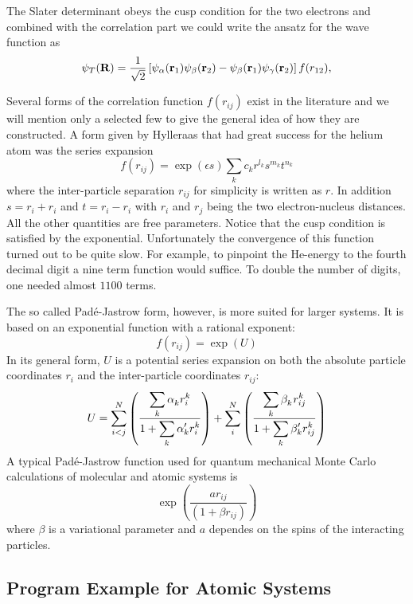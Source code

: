 The Slater determinant obeys the cusp condition for the two electrons and combined with the correlation
part we could write the ansatz for the wave function as
\[
   \psi_T({\bf R})=\frac{1}{\sqrt{2}}\left[
\psi_{\alpha}({\bf r}_1)\psi_{\beta}({\bf r}_2)-
\psi_{\beta}({\bf r}_1)\psi_{\gamma}({\bf r}_2)\right]f(r_{12}),
\]

Several forms of the correlation function $f(r_{ij})$ exist in the literature and we
will mention only a selected few to give the general idea of how they
are constructed. A form given by Hylleraas 
 that had great success for the helium atom was the
series expansion
\[
f(r_{ij})=\exp{(\epsilon s)}\sum_k c_k r^{l_k} s^{m_k} t^{n_k}
\]
where the inter-particle separation $r_{ij}$ for simplicity is written
as $r$. In addition $s=r_i+r_i$ and $t=r_i-r_i$ with $r_i$ and $r_j$ being the two
electron-nucleus distances. All the other quantities are free
parameters. Notice that the cusp condition is satisfied by the
exponential. Unfortunately the convergence of this function turned out
to be quite slow. For example, to pinpoint the He-energy to the fourth
decimal digit a nine term
function would suffice. To double the number of digits, one needed
almost $1100$ terms.

The so called Pad\'e-Jastrow form, however, is more suited for larger
systems. It is based on an exponential function with a rational
exponent:
\[
f(r_{ij})=\exp{(U)}
\]
In its general form, $U$ is a potential series expansion on both the
absolute particle coordinates $r_i$ and the inter-particle coordinates
$r_{ij}$:
\[
U=
\sum_{i<j}^{N}\left(
\frac{\displaystyle\sum_k\alpha_k^{\phantom{k}} r_i^k}
{\displaystyle 1+\sum_k\alpha_k^{\prime\vphantom{k}} r_i^k}
\right) +
\sum_i^{N}\left(
\frac{\displaystyle\sum_k\beta_k^{\phantom{k}} r_{ij}^k}
{\displaystyle 1+\sum_k\beta_k^{\prime\vphantom{k}} r_{ij}^k}
\right)
\]
A typical Pad\'e-Jastrow function used for quantum mechanical Monte Carlo  calculations of
molecular and atomic systems is
\[
\exp\left(\frac{a r_{ij}}{(1+\beta r_{ij})}\right)
\]
where $\beta$ is a variational parameter and $a$ dependes on the spins of the 
interacting particles. 



\subsection{Program Example for Atomic Systems}


